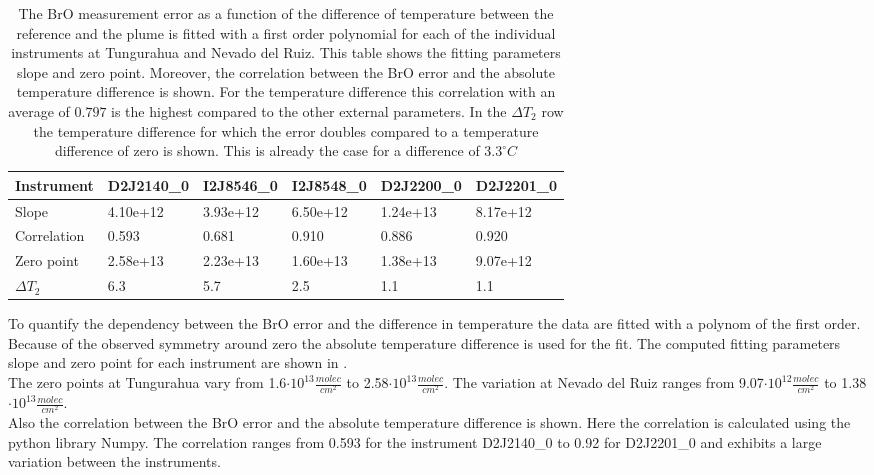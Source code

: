\begin{table}[h]
	\centering
	\begin{tabular}{|p{2cm}|p{2cm}|p{2cm}|p{2cm}|p{2cm}|p{2cm}|}
		Instrument	&D2J2140\_0&I2J8546\_0& I2J8548\_0&D2J2200\_0&D2J2201\_0\\
		\toprule
		Slope&4.10e+12 &3.93e+12 &6.50e+12 &1.24e+13&8.17e+12 \\
		\midrule
		Correlation
		& 
		0.593& 
		0.681& 
		0.910& 
		0.886& 
		0.920\\
		\midrule
		Zero point&2.58e+13&2.23e+13&1.60e+13& 1.38e+13& 9.07e+12\\
		\midrule
		$\Delta T_{2}$&6.3&5.7&2.5&1.1&1.1\\
		\bottomrule
	\end{tabular}
	\label{tab:tempe}
	\caption{The BrO measurement error as a function of the difference of temperature between the reference and the plume is fitted with a first order polynomial for each of the individual instruments at Tungurahua and Nevado del Ruiz. This table shows the fitting parameters slope and zero point. Moreover, the correlation between the BrO error and the absolute temperature difference is shown. For the temperature difference this correlation with an average of $0.797$ is the highest compared to the other external parameters. In the $\Delta T_{2}$ row the temperature difference for which the error doubles compared to a temperature difference of zero is shown. This is already the case for a difference of $3.3^\circ C$}
\end{table}
To quantify the dependency between the BrO error and the difference in temperature the data are fitted with a polynom of the first order. Because of the observed symmetry around zero the absolute temperature difference is used for the fit. The computed fitting parameters slope and zero point for each instrument are shown in . \\
The zero points at Tungurahua vary from 1.6$\cdot10^{13}\frac{molec}{cm^2}$ to 2.58$\cdot10^{13}\frac{molec}{cm^2}$. The variation at Nevado del Ruiz ranges from  9.07$\cdot10^{12}\frac{molec}{cm^2}$ to 1.38$\cdot10^{13}\frac{molec}{cm^2}$.\\
Also the correlation between the BrO error and the absolute temperature difference is shown. Here the correlation is calculated using the python library Numpy. The correlation ranges from 0.593 for the instrument D2J2140\_0 to  0.92 for D2J2201\_0 and exhibits a large variation between the instruments.\\
